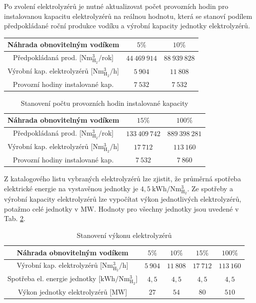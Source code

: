 \noindent
Po zvolení elektrolyzérů je nutné aktualizovat počet provozních hodin pro instalovanou kapacitu elektrolyzérů na reálnou hodnotu, která se stanoví podílem předpokládané roční produkce vodíku a výrobní kapacity jednotky elektrolyzérů.
\begin{table}[h!]
    \centering
    \begin{tabular}{|c|c|c|}
        \hline
        Náhrada obnovitelným vodíkem & $5\%$ & $10\%$\\ \hline
        Předpokládaná prod. [$\mathrm{Nm^3_{H_2}}/$rok] & $44\ 469\ 914$ & $88\ 939\ 828$\\ \hline
        Výrobní kap. elektrolyzérů [$\mathrm{Nm^3_{H_2}}/$h] & $5\ 904$ & $11\ 808$\\ \hline\hline
        Provozní hodiny instalované kap.& $7\ 532$ & $7\ 532$\\ \hline
    \end{tabular}
\end{table}
\begin{table}[h!]
    \centering
    \begin{tabular}{|c|c|c|}
        \hline
        Náhrada obnovitelným vodíkem & $15\%$ & $100\%$\\ \hline
        Předpokládaná prod. [$\mathrm{Nm^3_{H_2}}/$rok] & $133\ 409\ 742$ & $889\ 398\ 281$\\ \hline
        Výrobní kap. elektrolyzérů [$\mathrm{Nm^3_{H_2}}/$h] & $17\ 712$ & $113\ 160$ \\ \hline\hline
        Provozní hodiny instalované kap.& $7\ 532$ & $7\ 860$ \\ \hline
    \end{tabular}
    \caption[Stanovení počtu provozních hodin instalované kapacity]{Stanovení počtu provozních hodin instalované kapacity}
    \label{tab:provozni_hodiny}
\end{table}

\newpage
\noindent
Z katalogového listu vybraných elektrolyzérů lze zjistit, že průměrná spotřeba elektrické energie na vystavěnou jednotky je $4,5\ \mathrm{kWh/Nm^3_{H_2}}$. Ze spotřeby a výrobní kapacity elektrolyzérů lze vypočítat výkon jednotlivých elektrolyzérů, potažmo celé jednotky v $\mathrm{MW}$. Hodnoty pro všechny jednotky jsou uvedené v Tab. \ref{tab:vykony}.
\begin{table}[h]
    \centering
    \begin{tabular}{|c|c|c|c|c|}
        \hline
        Náhrada obnovitelným vodíkem & $5\%$ & $10\%$ & $15\%$ & $100\%$\\ \hline
        Výrobní kap. elektrolyzérů [$\mathrm{Nm^3_{H_2}}/$h] & $5\ 904$ & $11\ 808$ & $17\ 712$ & $113\ 160$ \\ \hline
        Spotřeba el. energie jednotky [$\mathrm{kWh/Nm^3_{H_2}}$] & $4,5$ & $4,5$ & $4,5$ & $4,5$ \\ \hline\hline
        Výkon jednotky elektrolyzérů [$\mathrm{MW}$] & $27$ & $54$ & $80$ & $510$ \\ \hline
    \end{tabular}
    \caption[Stanovení výkonu elektrolyzérů]{Stanovení výkonu elektrolyzérů}
    \label{tab:vykony}
\end{table}

